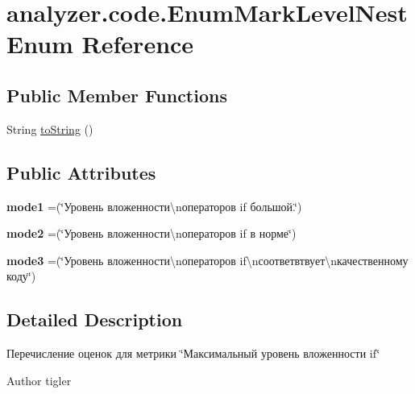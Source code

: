 \hypertarget{enumanalyzer_1_1code_1_1EnumMarkLevelNest}{}\section{analyzer.\+code.\+Enum\+Mark\+Level\+Nest Enum Reference}
\label{enumanalyzer_1_1code_1_1EnumMarkLevelNest}
\subsection*{Public Member Functions}
\begin{DoxyCompactItemize}
\item 
String \hyperlink{enumanalyzer_1_1code_1_1EnumMarkLevelNest_a00997fede2fe10301bff2b5a023685d3}{to\+String} ()
\end{DoxyCompactItemize}
\subsection*{Public Attributes}
\begin{DoxyCompactItemize}
\item 
\mbox{\label{enumanalyzer_1_1code_1_1EnumMarkLevelNest_a5ac19926bb8f5e3673869c621695c5d8}} 
{\bfseries mode1} =(\char`\"{}Уровень вложенности\textbackslash{}nоператоров if большой.\char`\"{})
\item 
\mbox{\label{enumanalyzer_1_1code_1_1EnumMarkLevelNest_a0727d5b6ba587aebe1f1cfd70c9a0e32}} 
{\bfseries mode2} =(\char`\"{}Уровень вложенности\textbackslash{}nоператоров if в норме\char`\"{})
\item 
\mbox{\label{enumanalyzer_1_1code_1_1EnumMarkLevelNest_a9dbfbf7b32361b97ced37b90df5ad631}} 
{\bfseries mode3} =(\char`\"{}Уровень вложенности\textbackslash{}nоператоров if\textbackslash{}nсоответвтвует\textbackslash{}nкачественному коду\char`\"{})
\end{DoxyCompactItemize}


\subsection{Detailed Description}
Перечисление оценок для метрики \char`\"{}Максимальный уровень вложенности if\char`\"{} \begin{DoxyAuthor}{Author}
tigler 
\end{DoxyAuthor}


